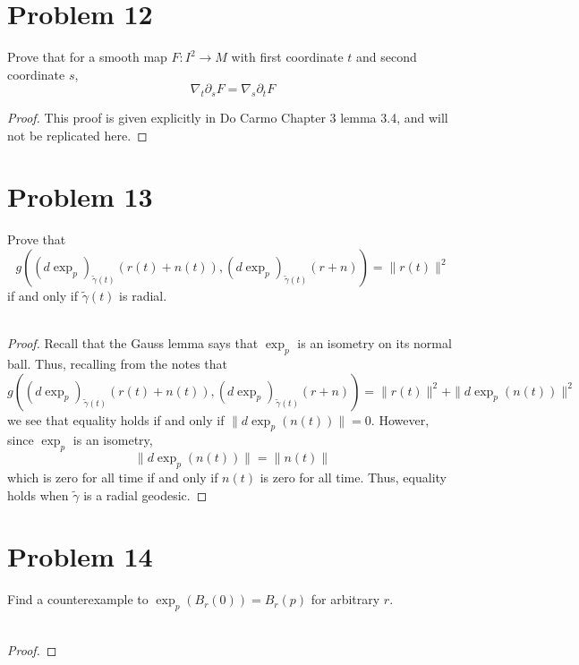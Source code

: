 \documentclass[fontsize=11pt]{scrartcl} %
\numberwithin{equation}{section} %
\numberwithin{figure}{section} %
\numberwithin{table}{section} %
\begin{document}
\section*{Problem 12}
Prove that for a smooth map $F:I^{2}\to M$ with first coordinate $t$ and second
coordinate $s$,
\[
    \nabla_t\partial_sF = \nabla_s\partial_tF
\]

\begin{proof}
    This proof is given explicitly in Do Carmo Chapter 3 lemma 3.4, and will not
    be replicated here.
\end{proof}

\section*{Problem 13}
Prove that
\[
    g((d\exp_p)_{\tilde{\gamma}(t)}(r(t)+n(t)),(d\exp_p)_{\tilde{\gamma}(t)}(r+n))
    = \|r(t)\|^2
\]
if and only if $\tilde{\gamma}(t)$ is radial.
\\
\\
\begin{proof}
    Recall that the Gauss lemma says that $\exp_p$ is an isometry on its normal
    ball. Thus, recalling from the notes that
    \[
    g((d\exp_p)_{\tilde{\gamma}(t)}(r(t)+n(t)),(d\exp_p)_{\tilde{\gamma}(t)}(r+n))
    = \|r(t)\|^2 + \|d\exp_p(n(t))\|^2
    \]
    we see that equality holds if and only if $\|d\exp_p(n(t))\|=0$. However,
    since $\exp_p$ is an isometry,
    \[
        \|d\exp_p(n(t))\| = \|n(t)\|
    \]
    which is zero for all time if and only if $n(t)$ is zero for all time. Thus,
    equality holds when $\tilde{\gamma}$ is a radial geodesic.
\end{proof}

\section*{Problem 14}
Find a counterexample to $\exp_p(B_r(0)) = B_r(p)$ for arbitrary $r$.
\\
\\
\begin{proof}
\end{proof}
\end{document}
